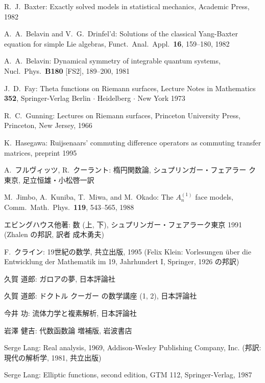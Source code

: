 \documentclass[12pt,twoside]{jarticle}
\begin{document}
\begin{thebibliography}{ABC}

R.~J.~Baxter: Exactly solved models in statistical mechanics, Academic
Press, 1982

A.~A.~Belavin and V.~G.~Drinfel'd: Solutions of the classical
Yang-Baxter equation for simple Lie algebras, %
Funct.~Anal.~Appl.~{\bf 16}, 159--180, 1982

A.~A.~Belavin: Dynamical symmetry of integrable quantum systems, 
Nucl.\ Phys.\ {\bf B180} [FS2], 189--200, 1981

J.~D.~Fay: Theta functions on Riemann surfaces, Lecture Notes in
Mathematics {\bf 352}, Springer-Verlag
Berlin $\cdot$ Heidelberg $\cdot$ New York 1973

R.~C.~Gunning: Lectures on Riemann surfaces, Princeton University
Press, Princeton, New Jersey, 1966

K.~Hasegawa: Ruijsenaars' commuting difference operators as commuting
transfer matrices, preprint 1995

A.~フルヴィッツ, R.~クーラント: 楕円関数論, シュプリンガー・フェアラー
ク東京, 足立恒雄・小松啓一訳

M.~Jimbo, A.~Kuniba, T.~Miwa, and M.~Okado: The $A_n^{(1)}$ face
models, Comm.\ Math.\ Phys.\ {\bf 119}, 543--565, 1988

エビングハウス他著: 数  (上, 下), シュプリンガー・フェアラーク東京 1991
(Zhalen の邦訳, 訳者 成木勇夫)

F.~クライン: 19世紀の数学, 共立出版, 1995 (Felix Klein: Vorlesungen
\"uber die Entwicklung der Mathematik im 19, Jahrhundert I, Springer,
1926 の邦訳)

久賀 道郎: ガロアの夢, 日本評論社

久賀 道郎: ドクトル クーガー の数学講座 (1, 2), 日本評論社

今井 功: 流体力学と複素解析, 日本評論社

岩澤 健吉: 代数函数論 増補版, 岩波書店

Serge Lang: Real analysis, 1969, Addison-Wesley Publishing Company,
Inc. (邦訳: 現代の解析学, 1981, 共立出版)

Serge Lang: Elliptic functions, second edition, GTM 112,
Springer-Verlag, 1987


\end{thebibliography}
\end{document}
